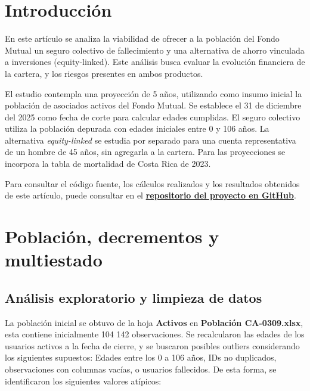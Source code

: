 \documentclass[11pt]{article}
\begin{document}
\newpage


\section*{Introducción}

\vspace{-0.6cm}

En este artículo se analiza la viabilidad de ofrecer a la población del Fondo Mutual un seguro colectivo de fallecimiento y una alternativa de ahorro vinculada a inversiones (equity-linked). Este análisis busca evaluar la evolución financiera de la cartera, y los riesgos presentes en ambos productos.

 \vspace{-0.3cm}

El estudio contempla una proyección de 5 años, utilizando como insumo inicial la población de asociados activos del Fondo Mutual. Se establece el 31 de diciembre del 2025 como fecha de corte para calcular edades cumplidas. El seguro colectivo utiliza la población depurada con edades iniciales entre 0 y 106 años. La alternativa \textit{equity-linked} se estudia por separado para una cuenta representativa de un hombre de 45 años, sin agregarla a la cartera. Para las proyecciones se incorpora la tabla de mortalidad de Costa Rica de 2023.

 \vspace{-0.3cm}

Para consultar el código fuente, los cálculos realizados y los resultados obtenidos de este artículo, puede consultar en el 
\href{https://github.com/KevinCalderon2811/CA0309_Proyecto}
{\textbf{repositorio del proyecto en GitHub}}.

\vspace{-0.6cm}

\section{Población, decrementos y multiestado}

\vspace{-0.4cm}

\subsection{Análisis exploratorio y limpieza de datos}

\vspace{-0.6cm}

La población inicial se obtuvo de la hoja \textbf{Activos} en \textbf{Población CA-0309.xlsx}, esta contiene inicialmente 104 142 observaciones. Se recalcularon las edades de los usuarios activos a la fecha de cierre, y se buscaron posibles outliers considerando los siguientes supuestos: Edades entre los 0 a 106 años, IDs no duplicados, observaciones con columnas vacías, o usuarios fallecidos. De esta forma, se identificaron los siguientes valores atípicos:
\end{document}
